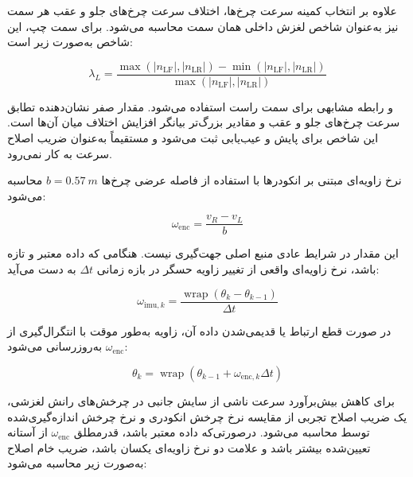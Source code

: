 علاوه بر انتخاب کمینه سرعت چرخ‌ها، اختلاف سرعت چرخ‌های جلو و عقب هر سمت نیز به‌عنوان شاخص لغزش داخلی همان سمت محاسبه می‌شود. برای سمت چپ، این شاخص به‌صورت زیر است:

\begin{equation}
	\lambda_L =
	\frac{
		\max\left(|n_{\mathrm{LF}}|,|n_{\mathrm{LR}}|\right)
		-
		\min\left(|n_{\mathrm{LF}}|,|n_{\mathrm{LR}}|\right)
	}{
		\max\left(|n_{\mathrm{LF}}|,|n_{\mathrm{LR}}|\right)
	}
	\label{eq:real_odom_front_rear_slip}
\end{equation}

و رابطه مشابهی برای سمت راست استفاده می‌شود. مقدار صفر نشان‌دهنده تطابق سرعت چرخ‌های جلو و عقب و مقادیر بزرگ‌تر بیانگر افزایش اختلاف میان آن‌ها است. این شاخص برای پایش و عیب‌یابی ثبت می‌شود و مستقیماً به‌عنوان ضریب اصلاح سرعت به کار نمی‌رود.

نرخ زاویه‌ای مبتنی بر انکودرها با استفاده از فاصله عرضی چرخ‌ها $b=0.57~m$ محاسبه می‌شود:

\begin{equation}
	\omega_{\mathrm{enc}} =
	\frac{v_R-v_L}{b}
	\label{eq:real_odom_encoder_omega}
\end{equation}

این مقدار در شرایط عادی منبع اصلی جهت‌گیری نیست. هنگامی که داده  معتبر و تازه باشد، نرخ زاویه‌ای واقعی از تغییر زاویه حسگر در بازه زمانی $\Delta t$ به دست می‌آید:

\begin{equation}
	\omega_{\mathrm{imu},k} =
	\frac{
		\operatorname{wrap}
		\left(
		\theta_k-\theta_{k-1}
		\right)
	}{
		\Delta t
	}
	\label{eq:real_odom_imu_omega}
\end{equation}

در صورت قطع ارتباط  یا قدیمی‌شدن داده آن، زاویه به‌طور موقت با انتگرال‌گیری از $\omega_{\mathrm{enc}}$ به‌روزرسانی می‌شود:

\begin{equation}
	\theta_k =
	\operatorname{wrap}
	\left(
	\theta_{k-1}
	+
	\omega_{\mathrm{enc},k}\Delta t
	\right)
	\label{eq:real_odom_encoder_fallback}
\end{equation}

برای کاهش بیش‌برآورد سرعت ناشی از سایش جانبی در چرخش‌های رانش لغزشی، یک ضریب اصلاح تجربی از مقایسه نرخ چرخش انکودری و نرخ چرخش اندازه‌گیری‌شده توسط  محاسبه می‌شود. درصورتی‌که داده  معتبر باشد، قدرمطلق $\omega_{\mathrm{enc}}$ از آستانه تعیین‌شده بیشتر باشد و علامت دو نرخ زاویه‌ای یکسان باشد، ضریب خام اصلاح به‌صورت زیر محاسبه می‌شود:

